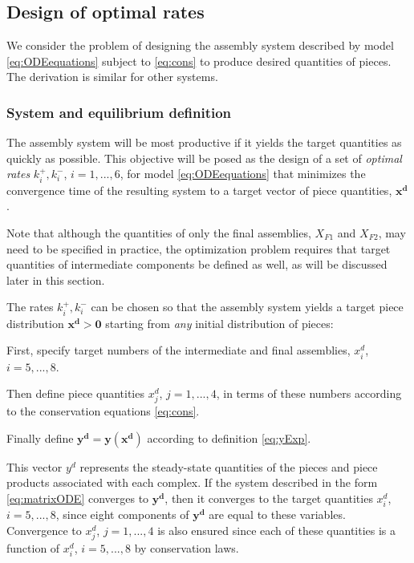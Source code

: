     \subsection{Design of optimal rates} %
    \label{sub:design_of_optimal_rates}

        We consider the problem of designing the assembly system
        described by model \eqref{eq:ODEequations} subject to
        \eqref{eq:cons} to produce desired quantities of pieces. The derivation is similar for other systems.

        \subsubsection{System and equilibrium definition} %
        \label{ssub:system_and_equilibrium_definition}
        The assembly system will be most productive if it yields the target
        quantities as quickly as possible.  This objective will be posed as
        the design of a set of {\it optimal rates} $k_i^+, k_i^-$, $i=1,...,6$, for
        model \eqref{eq:ODEequations} that minimizes the convergence time
        of the resulting system to a target vector of piece quantities,
        $\mathbf{x^d}$.

        Note that although the quantities of only the final
        assemblies, $X_{F1}$ and $X_{F2}$, may need to be specified in
        practice, the optimization problem requires that target quantities
        of intermediate components be defined as well, as will be discussed
        later in this section.

        The rates $k_i^+, k_i^-$ can be chosen so that the assembly system yields a
        target piece distribution $\mathbf{x^d}
        > \mathbf{0}$ starting from {\it any} initial distribution of
        pieces:

        \begin{my_enumerate}
            \item First, specify target numbers of the intermediate and final assemblies, $x_i^d$, $i=5,...,8$.
            \item Then define piece quantities $x_j^d$, $j=1,...,4$, in terms of these numbers according to the conservation equations \eqref{eq:cons}.
            \item Finally define $\mathbf{y^d} = \mathbf{y(x^d)}$ according to definition \eqref{eq:yExp}.
        \end{my_enumerate}

        This vector $y^d$ represents the steady-state quantities of the pieces and piece products associated with each complex.
        If the system described in the form \eqref{eq:matrixODE} converges to $\mathbf{y^d}$, then it converges to the
        target quantities $x_i^d$, $i=5,...,8$, since eight components of
        $\mathbf{y^d}$ are equal to these variables. Convergence to $x_j^d$, $j=1,...,4$ is also ensured since each of these quantities is a
        function of $x_i^d$, $i=5,...,8$ by conservation laws.

